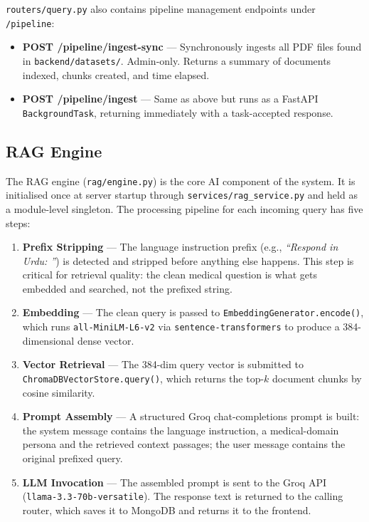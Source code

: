 \texttt{routers/query.py} also contains pipeline management endpoints under
\texttt{/pipeline}:

\begin{itemize}
  \item \textbf{POST /pipeline/ingest-sync} — Synchronously ingests all PDF files
        found in \texttt{backend/datasets/}. Admin-only. Returns a summary of documents
        indexed, chunks created, and time elapsed.

  \item \textbf{POST /pipeline/ingest} — Same as above but runs as a FastAPI
        \texttt{BackgroundTask}, returning immediately with a task-accepted response.
\end{itemize}

\subsection{RAG Engine}
\label{sec:rag-engine}

The RAG engine (\texttt{rag/engine.py}) is the core AI component of the system.
It is initialised once at server startup through \texttt{services/rag\_service.py} and
held as a module-level singleton. The processing pipeline for each incoming query has
five steps:

\begin{enumerate}
  \item \textbf{Prefix Stripping} --- The language instruction prefix (e.g.,
        \textit{``Respond in Urdu: ''}) is detected and stripped before anything else
        happens. This step is critical for retrieval quality: the clean medical question
        is what gets embedded and searched, not the prefixed string.

  \item \textbf{Embedding} --- The clean query is passed to
        \texttt{EmbeddingGenerator.encode()}, which runs \texttt{all-MiniLM-L6-v2} via
        \texttt{sentence-transformers} to produce a 384-dimensional dense vector.

  \item \textbf{Vector Retrieval} --- The 384-dim query vector is submitted to
        \texttt{ChromaDBVectorStore.query()}, which returns the top-$k$ document chunks
        by cosine similarity.

  \item \textbf{Prompt Assembly} --- A structured Groq chat-completions prompt is built:
        the system message contains the language instruction, a medical-domain persona
        and the retrieved context passages; the user message contains the original
        prefixed query.

  \item \textbf{LLM Invocation} --- The assembled prompt is sent to the Groq API
        (\texttt{llama-3.3-70b-versatile}). The response text is returned to the calling
        router, which saves it to MongoDB and returns it to the frontend.
\end{enumerate}

